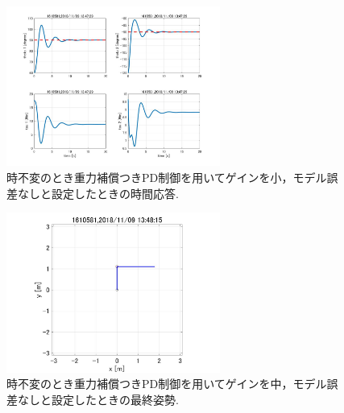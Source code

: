 \documentclass[twocolumn, 10pt,a4j]{jsarticle}
\begin{document}
    \begin{figure}[H]
      \begin{center}
        \includegraphics[width=7cm]{../img/img/kansetu_juryoku_hosyou_PD_zifuhen_small_no_model_gosa_zikan_auto.jpg}
        \caption{時不変のとき重力補償つきPD制御を用いてゲインを小，モデル誤差なしと設定したときの時間応答.}
      \end{center}
    \end{figure}
    \begin{figure}[H]
      \begin{center}
        \includegraphics[width=7cm]{../img/img/kansetu_juryoku_hosyou_PD_zifuhen_chu_no_model_gosa_saisyu_sisei.jpg}
        \caption{時不変のとき重力補償つきPD制御を用いてゲインを中，モデル誤差なしと設定したときの最終姿勢.}
      \end{center}
    \end{figure}
\end{document}
